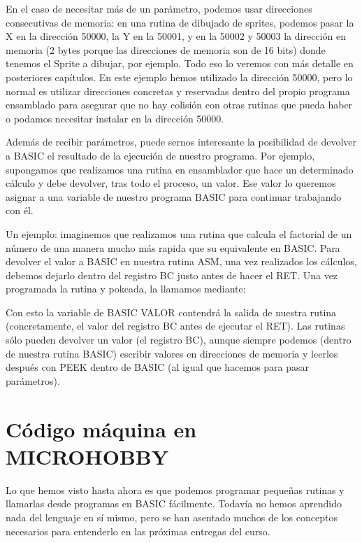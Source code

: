 \documentclass[letterpaper,10pt,spanish]{sphinxmanual}
\begin{document}
En el caso de necesitar más de un parámetro, podemos usar direcciones consecutivas de memoria: en una rutina de dibujado de sprites, podemos pasar la X en la dirección 50000, la Y en la 50001, y en la 50002 y 50003 la dirección en memoria (2 bytes porque las direcciones de memoria son de 16 bits) donde tenemos el Sprite a dibujar, por ejemplo. Todo eso lo veremos con más detalle en posteriores capítulos. En este ejemplo hemos utilizado la dirección 50000, pero lo normal es utilizar direcciones concretas y reservadas dentro del propio programa ensamblado para asegurar que no hay colisión con otras rutinas que pueda haber o podamos necesitar instalar en la dirección 50000.

Además de recibir parámetros, puede sernos interesante la posibilidad de devolver a BASIC el resultado de la ejecución de nuestro programa. Por ejemplo, supongamos que realizamos una rutina en ensamblador que hace un determinado cálculo y debe devolver, tras todo el proceso, un valor. Ese valor lo queremos asignar a una variable de nuestro programa BASIC para continuar trabajando con él.

Un ejemplo: imaginemos que realizamos una rutina que calcula el factorial de un número de una manera mucho más rapida que su equivalente en BASIC. Para devolver el valor a BASIC en nuestra rutina ASM, una vez realizados los cálculos, debemos dejarlo dentro del registro BC justo antes de hacer el RET. Una vez programada la rutina y pokeada, la llamamos mediante:

\begin{sphinxVerbatim}[commandchars=\\\{\}]
\end{sphinxVerbatim}

Con esto la variable de BASIC VALOR contendrá la salida de nuestra rutina (concretamente, el valor del registro BC antes de ejecutar el RET). Las rutinas sólo pueden devolver un valor (el registro BC), aunque siempre podemos (dentro de nuestra rutina BASIC) escribir valores en direcciones de memoria y leerlos después con PEEK dentro de BASIC (al igual que hacemos para pasar parámetros).


\section{Código máquina en MICROHOBBY}
\label{\detokenize{02_introduccion/introduccion:codigo-maquina-en-microhobby}}
Lo que hemos visto hasta ahora es que podemos programar pequeñas rutinas y llamarlas desde programas en BASIC fácilmente. Todavía no hemos aprendido nada del lenguaje en sí mismo, pero se han asentado muchos de los conceptos necesarios para entenderlo en las próximas entregas del curso.
\end{document}
